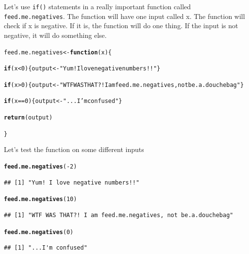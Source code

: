 \documentclass{tufte-book}\usepackage[]{graphicx}\usepackage[]{color}
\makeatletter
\newcommand{\hlnum}[1]{\textcolor[rgb]{0.686,0.059,0.569}{#1}}%
\newcommand{\hlstr}[1]{\textcolor[rgb]{0.192,0.494,0.8}{#1}}%
\newcommand{\hlopt}[1]{\textcolor[rgb]{0,0,0}{#1}}%
\newcommand{\hlstd}[1]{\textcolor[rgb]{0.345,0.345,0.345}{#1}}%
\newcommand{\hlkwa}[1]{\textcolor[rgb]{0.161,0.373,0.58}{\textbf{#1}}}%
\newcommand{\hlkwb}[1]{\textcolor[rgb]{0.69,0.353,0.396}{#1}}%
\newcommand{\hlkwc}[1]{\textcolor[rgb]{0.333,0.667,0.333}{#1}}%
\newcommand{\hlkwd}[1]{\textcolor[rgb]{0.737,0.353,0.396}{\textbf{#1}}}%
\newenvironment{kframe}{%
 \def\at@end@of@kframe{}%
 \ifinner\ifhmode%
  \def\at@end@of@kframe{\end{minipage}}%
  \begin{minipage}{\columnwidth}%
 \fi\fi%
 \def\FrameCommand##1{\hskip\@totalleftmargin \hskip-\fboxsep
 \colorbox{shadecolor}{##1}\hskip-\fboxsep
     \hskip-\linewidth \hskip-\@totalleftmargin \hskip\columnwidth}%
 \MakeFramed {\advance\hsize-\width
   \@totalleftmargin\z@ \linewidth\hsize
   \@setminipage}}%
 {\par\unskip\endMakeFramed%
 \at@end@of@kframe}
\newenvironment{knitrout}{}{} %
\makeatother
\begin{document}
Let's use \texttt{if()} statements in a really important function called \texttt{feed.me.negatives}. The function will have one input called x. The function will check if x is negative. If it is, the function will do one thing. If the input is not negative, it will do something else.

\begin{knitrout}
\color{fgcolor}\begin{kframe}
\begin{alltt}
\hlstd{feed.me.negatives} \hlkwb{<-} \hlkwa{function}\hlstd{(}\hlkwc{x}\hlstd{) \{}

\hlkwa{if}\hlstd{(x} \hlopt{<} \hlnum{0}\hlstd{) \{output} \hlkwb{<-} \hlstr{"Yum! I love negative numbers!!"}\hlstd{\}}

\hlkwa{if}\hlstd{(x} \hlopt{>} \hlnum{0}\hlstd{) \{output} \hlkwb{<-} \hlstr{"WTF WAS THAT?! I am feed.me.negatives, not be.a.douchebag"}\hlstd{\}}

\hlkwa{if}\hlstd{(x} \hlopt{==} \hlnum{0}\hlstd{) \{output} \hlkwb{<-} \hlstr{"...I'm confused"}\hlstd{\}}

\hlkwd{return}\hlstd{(output)}

\hlstd{\}}
\end{alltt}
\end{kframe}
\end{knitrout}

Let's test the function on some different inputs

\begin{knitrout}
\color{fgcolor}\begin{kframe}
\begin{alltt}
\hlkwd{feed.me.negatives}\hlstd{(}\hlopt{-}\hlnum{2}\hlstd{)}
\end{alltt}
\begin{verbatim}
## [1] "Yum! I love negative numbers!!"
\end{verbatim}
\begin{alltt}
\hlkwd{feed.me.negatives}\hlstd{(}\hlnum{10}\hlstd{)}
\end{alltt}
\begin{verbatim}
## [1] "WTF WAS THAT?! I am feed.me.negatives, not be.a.douchebag"
\end{verbatim}
\begin{alltt}
\hlkwd{feed.me.negatives}\hlstd{(}\hlnum{0}\hlstd{)}
\end{alltt}
\begin{verbatim}
## [1] "...I'm confused"
\end{verbatim}
\end{kframe}
\end{knitrout}
\end{document}
